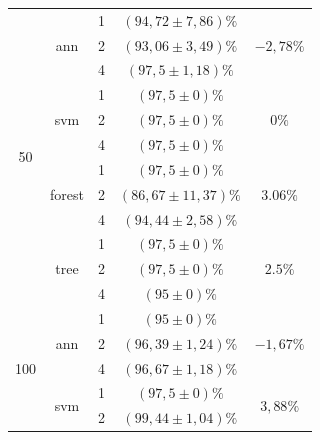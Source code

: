 \begin{table}[]
\begin{tabular}{|c|c|c|c|c|}
\multirow{12}{*}{50}  & \multirow{3}{*}{ann}    & 1                & $ (94,72 \pm 7,86) \% $   & \multirow{3}{*}{$-2,78 \%$} \\ \cline{3-4} 
                      &                         & 2                & $ (93,06 \pm 3,49) \% $  & \\ \cline{3-4} 
                      &                         & 4                & $ (97,5 \pm 1,18) \% $    &\\ \cline{2-5} 
                      & \multirow{3}{*}{svm}    & 1                & $ (97,5 \pm 0) \% $       & \multirow{3}{*}{$0 \%$} \\ \cline{3-4} 
                      &                         & 2                & $ (97,5 \pm 0) \% $     &  \\ \cline{3-4} 
                      &                         & 4                & $ (97,5 \pm 0) \% $       & \\ \cline{2-5} 
                      & \multirow{3}{*}{forest} & 1                & $ (97,5 \pm 0) \% $       & \multirow{3}{*}{$3.06\%$} \\ \cline{3-4} 
                      &                         & 2                & $ (86,67 \pm 11,37) \% $ & \\ \cline{3-4} 
                      &                         & 4                & $ (94,44 \pm 2,58) \% $   &\\ \cline{2-5} 
                      & \multirow{3}{*}{tree}   & 1                & $ (97,5 \pm 0) \% $       & \multirow{3}{*}{$2.5\%$} \\ \cline{3-4} 
                      &                         & 2                & $ (97,5 \pm 0) \% $      & \\ \cline{3-4} 
                      &                         & 4                & $ (95 \pm 0) \%   $      &\\ \hline
\multirow{12}{*}{100} & \multirow{3}{*}{ann}    & 1                & $ (95 \pm 0) \%   $      & \multirow{3}{*}{$-1,67 \%$} \\ \cline{3-4} 
                      &                         & 2                & $ (96,39 \pm 1,24) \% $   &\\ \cline{3-4} 
                      &                         & 4                & $ (96,67 \pm 1,18) \% $  & \\ \cline{2-5} 
                      & \multirow{3}{*}{svm}    & 1                & $ (97,5 \pm 0) \% $       & \multirow{3}{*}{$3,88\%$} \\ \cline{3-4} 
                      &                         & 2                & $ (99,44 \pm 1,04) \% $  & \\ \cline{3-4} 

\end{tabular}
\end{table}
